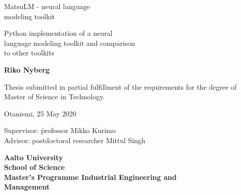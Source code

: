 {\parindent0pt %
\begin{spacing}{1.1}

 {\sffamily{}}
\end{spacing}

\vspace{12.7mm}

\begin{spacing}{1.63}
{\fontsize{17.8pt}{17.8pt}\selectfont MatsuLM - neural language\\modeling toolkit}
\end{spacing}

\vspace{10.5mm}

\begin{spacing}{1.2}
{\fontsize{13pt}{13pt}\selectfont 
Python implementation of a neural\\language modeling toolkit and comparison \\to other toolkits}
\end{spacing}

\vspace{10.6mm}

{\fontsize{13.9pt}{13.9pt}\bfseries\sffamily\lsstyle Riko Nyberg}

\vfill

{\fontsize{10.3pt}{10.3pt}\sffamily\lsstyle\raggedright
\begin{spacing}{1.06}

Thesis submitted in partial fulfillment of the requirements for the
degree of Master of Science in Technology.

Otaniemi, 25 May 2020

\begin{tabbing}
Supervisor:\hspace{6mm} \= professor Mikko Kurimo \\
Advisor: \> postdoctoral researcher Mittul Singh
\end{tabbing}
\vspace{-4mm}
\end{spacing}
} %

\vspace{11.5mm}

\begin{spacing}{.9}
{\bfseries\sffamily\lsstyle Aalto University \\
School of Science \\
Master's Programme Industrial Engineering and \\Management}
\end{spacing}
} %



